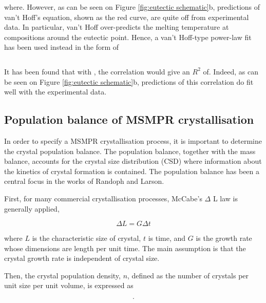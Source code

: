 \begin{equation}
    
\end{equation}

\noindent where. However, as can be seen on Figure \ref{fig:eutectic schematic}b, predictions of van't Hoff's equation, shown as the red curve, are quite off from experimental data. In particular, van't Hoff over-predicts the melting temperature at compositions around the eutectic point. Hence, a van't Hoff-type power-law fit has been used instead in the form of 

\begin{equation}
    
\end{equation}

\noindent It has been found that with , the correlation would give an $R^2$ of. Indeed, as can be seen on Figure \ref{fig:eutectic schematic}b, predictions of this correlation do fit well with the experimental data.

\subsection{Population balance of MSMPR crystallisation}
In order to specify a MSMPR crystallisation process, it is important to determine the crystal population balance. The population balance, together with the mass balance, accounts for the crystal size distribution (CSD) where information about the kinetics of crystal formation is contained. The population balance has been a central focus in the works of Randoph and Larson. 

First, for many commercial crystallisation processes, McCabe's $\Delta$ L law is generally applied, 

\begin{equation} \label{eq: McCabe deltaL}
    \Delta L = G \Delta t
\end{equation}

\noindent where $L$ is the characteristic size of crystal, $t$ is time, and $G$ is the growth rate whose dimensions are length per unit time. The main assumption is that the crystal growth rate is independent of crystal size. 

Then, the crystal population density, $n$, defined as the number of crystals per unit size per unit volume, is expressed as 

\begin{equation} \label{eq:crystal population density definition}
    .
\end{equation}







